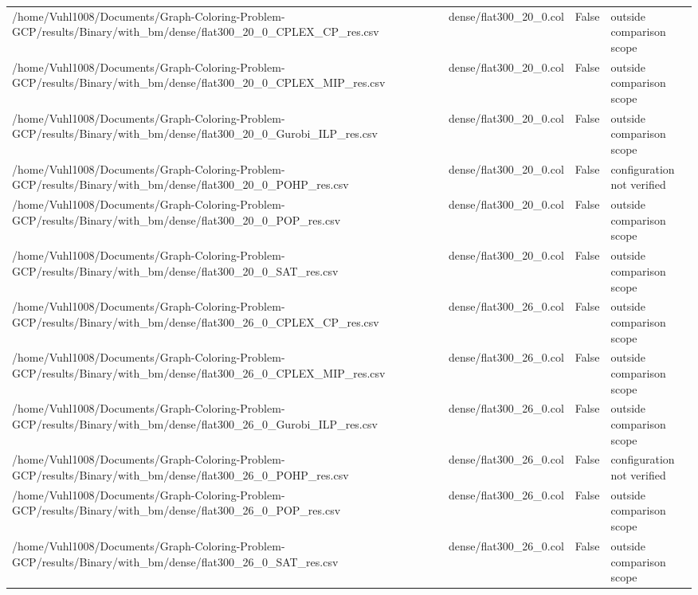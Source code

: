 \begin{table}[htbp]
\begin{tabular}{llll}
/home/Vuhl1008/Documents/Graph-Coloring-Problem-GCP/results/Binary/with\_bm/dense/flat300\_20\_0\_CPLEX\_CP\_res.csv & dense/flat300\_20\_0.col & False & outside comparison scope \\
/home/Vuhl1008/Documents/Graph-Coloring-Problem-GCP/results/Binary/with\_bm/dense/flat300\_20\_0\_CPLEX\_MIP\_res.csv & dense/flat300\_20\_0.col & False & outside comparison scope \\
/home/Vuhl1008/Documents/Graph-Coloring-Problem-GCP/results/Binary/with\_bm/dense/flat300\_20\_0\_Gurobi\_ILP\_res.csv & dense/flat300\_20\_0.col & False & outside comparison scope \\
/home/Vuhl1008/Documents/Graph-Coloring-Problem-GCP/results/Binary/with\_bm/dense/flat300\_20\_0\_POHP\_res.csv & dense/flat300\_20\_0.col & False & configuration not verified \\
/home/Vuhl1008/Documents/Graph-Coloring-Problem-GCP/results/Binary/with\_bm/dense/flat300\_20\_0\_POP\_res.csv & dense/flat300\_20\_0.col & False & outside comparison scope \\
/home/Vuhl1008/Documents/Graph-Coloring-Problem-GCP/results/Binary/with\_bm/dense/flat300\_20\_0\_SAT\_res.csv & dense/flat300\_20\_0.col & False & outside comparison scope \\
/home/Vuhl1008/Documents/Graph-Coloring-Problem-GCP/results/Binary/with\_bm/dense/flat300\_26\_0\_CPLEX\_CP\_res.csv & dense/flat300\_26\_0.col & False & outside comparison scope \\
/home/Vuhl1008/Documents/Graph-Coloring-Problem-GCP/results/Binary/with\_bm/dense/flat300\_26\_0\_CPLEX\_MIP\_res.csv & dense/flat300\_26\_0.col & False & outside comparison scope \\
/home/Vuhl1008/Documents/Graph-Coloring-Problem-GCP/results/Binary/with\_bm/dense/flat300\_26\_0\_Gurobi\_ILP\_res.csv & dense/flat300\_26\_0.col & False & outside comparison scope \\
/home/Vuhl1008/Documents/Graph-Coloring-Problem-GCP/results/Binary/with\_bm/dense/flat300\_26\_0\_POHP\_res.csv & dense/flat300\_26\_0.col & False & configuration not verified \\
/home/Vuhl1008/Documents/Graph-Coloring-Problem-GCP/results/Binary/with\_bm/dense/flat300\_26\_0\_POP\_res.csv & dense/flat300\_26\_0.col & False & outside comparison scope \\
/home/Vuhl1008/Documents/Graph-Coloring-Problem-GCP/results/Binary/with\_bm/dense/flat300\_26\_0\_SAT\_res.csv & dense/flat300\_26\_0.col & False & outside comparison scope \\

\end{tabular}
\end{table}
